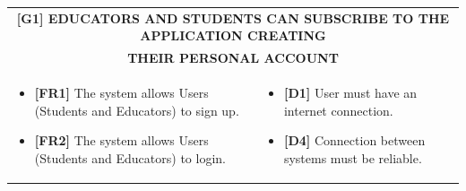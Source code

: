 \documentclass{article}
\begin{document}
\begin{table}
\begin{adjustwidth}{-1in}{-1in}
 \renewcommand{\arraystretch}{1.5}
    \begin{tabular}{|p{9.5cm}|p{9.5cm}|}
        \hline
        \multicolumn{2}{|c|}{\textbf{[G1] EDUCATORS AND STUDENTS CAN SUBSCRIBE TO THE APPLICATION CREATING}} \\
        \multicolumn{2}{|c|}{\textbf{THEIR PERSONAL ACCOUNT}}\\
        \hline
        \begin{itemize}[label={}, left=0pt, align=left, itemsep=5pt]
            \item \textbf{[FR1]} The system allows Users (Students and Educators) to sign up.
            \item \textbf{[FR2]} The system allows Users (Students and Educators) to login.
        \end{itemize} &
        \begin{itemize} [label={}, left=0pt, align=left, itemsep=5pt]
            \item \textbf{[D1]} User must have an internet connection. 
            \item \textbf{[D4]} Connection between systems must be reliable.
        \end{itemize} \\
        \hline
    \end{tabular}
\end{adjustwidth}
\end{table}
\end{document}
